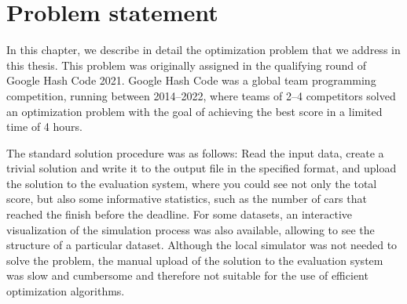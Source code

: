 \chapter{Problem statement}


In this chapter, we describe in detail the optimization problem that we address in this thesis. This problem was originally assigned in the qualifying round of Google Hash Code 2021. Google Hash Code was a global team programming competition, running between 2014--2022, where teams of 2--4 competitors solved an optimization problem with the goal of achieving the best score in a limited time of 4 hours.


The standard solution procedure was as follows: Read the input data, create a trivial solution and write it to the output file in the specified format, and upload the solution to the evaluation system, where you could see not only the total score, but also some informative statistics, such as the number of cars that reached the finish before the deadline. For some datasets, an interactive visualization of the simulation process was also available, allowing to see the structure of a particular dataset. Although the local simulator was not needed to solve the problem, the manual upload of the solution to the evaluation system was slow and cumbersome and therefore not suitable for the use of efficient optimization algorithms.

